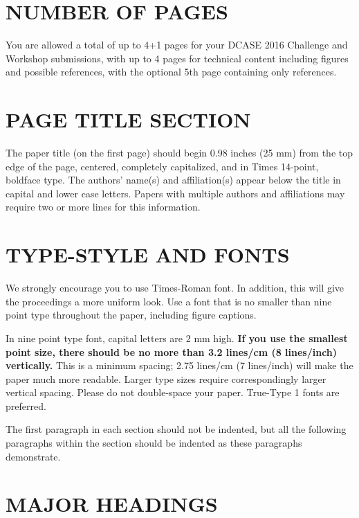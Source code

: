 \documentclass{article}
\begin{document}
\begin{sloppy}
\section{NUMBER OF PAGES}
\label{sec:pagelimit}

You are allowed a total of up to 4+1 pages for your DCASE 2016 Challenge 
and Workshop submissions, with up to 4 pages for technical content including 
figures and possible references, with the optional 5th page containing only
references. 

\section{PAGE TITLE SECTION}
\label{sec:pagestyle}

The paper title (on the first page) should begin 0.98 inches 
(25 mm) from the top edge of the page, centered, completely 
capitalized, and in Times 14-point, boldface type.  
The authors' name(s) and affiliation(s) appear below the title
in capital and lower case letters.  Papers with multiple authors 
and affiliations may require two or more lines for this information.

\section{TYPE-STYLE AND FONTS}
\label{sec:typestyle}

We strongly encourage you to use Times-Roman 
font. In addition, this will give the proceedings a more uniform 
look. Use a font that is no smaller than nine point type 
throughout the paper, including figure captions.

In nine point type font, capital letters are 2 mm high.  
{\bf If you use the smallest point size, there should be 
no more than 3.2 lines/cm (8 lines/inch) vertically.}  
This is a minimum spacing; 2.75 lines/cm (7 lines/inch) 
will make the paper much more readable. Larger type sizes 
require correspondingly larger vertical spacing. Please do 
not double-space your paper. True-Type 1 fonts are preferred.

The first paragraph in each section should not be indented, 
but all the following paragraphs within the section should 
be indented as these paragraphs demonstrate.

\section{MAJOR HEADINGS}
\label{sec:majhead}


\end{sloppy}
\end{document}
